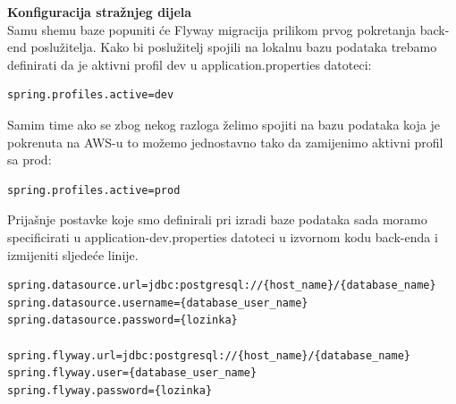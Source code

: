 \hfill \break
\textbf{Konfiguracija stražnjeg dijela}\\
Samu shemu baze popuniti će Flyway migracija prilikom prvog pokretanja back-end poslužitelja. Kako bi poslužitelj spojili na lokalnu bazu podataka trebamo definirati da je aktivni profil dev u application.properties datoteci:
\begin{lstlisting}
spring.profiles.active=dev
\end{lstlisting}

Samim time ako se zbog nekog razloga želimo spojiti na bazu podataka koja je pokrenuta na AWS-u to možemo jednostavno tako da zamijenimo aktivni profil sa prod:
\begin{lstlisting}
spring.profiles.active=prod
\end{lstlisting}

Prijašnje postavke koje smo definirali pri izradi baze podataka sada moramo specificirati u application-dev.properties datoteci u izvornom kodu back-enda i izmijeniti sljedeće linije.
\lstset{}
\begin{lstlisting}[]
spring.datasource.url=jdbc:postgresql://{host_name}/{database_name}
spring.datasource.username={database_user_name}
spring.datasource.password={lozinka}

spring.flyway.url=jdbc:postgresql://{host_name}/{database_name}
spring.flyway.user={database_user_name}
spring.flyway.password={lozinka}
\end{lstlisting}

